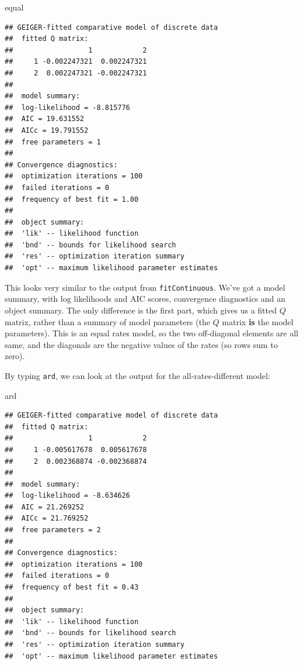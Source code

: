 \documentclass[]{book}
\newenvironment{Shaded}{\begin{snugshade}}{\end{snugshade}}
\newcommand{\NormalTok}[1]{{#1}}
\begin{document}
\begin{Shaded}
\begin{Highlighting}[]
\NormalTok{equal}
\end{Highlighting}
\end{Shaded}

\begin{verbatim}
## GEIGER-fitted comparative model of discrete data
##  fitted Q matrix:
##                  1            2
##     1 -0.002247321  0.002247321
##     2  0.002247321 -0.002247321
## 
##  model summary:
##  log-likelihood = -8.815776
##  AIC = 19.631552
##  AICc = 19.791552
##  free parameters = 1
## 
## Convergence diagnostics:
##  optimization iterations = 100
##  failed iterations = 0
##  frequency of best fit = 1.00
## 
##  object summary:
##  'lik' -- likelihood function
##  'bnd' -- bounds for likelihood search
##  'res' -- optimization iteration summary
##  'opt' -- maximum likelihood parameter estimates
\end{verbatim}

This looks very similar to the output from \texttt{fitContinuous}. We've
got a model summary, with log likelihoods and AIC scores, convergence
diagnostics and an object summary. The only difference is the first
part, which gives us a fitted \(Q\) matrix, rather than a summary of
model parameters (the \(Q\) matrix \textbf{is} the model parameters).
This is an equal rates model, so the two off-diagonal elements are all
same, and the diagonals are the negative values of the rates (so rows
sum to zero).

By typing \texttt{ard}, we can look at the output for the
all-rates-different model:

\begin{Shaded}
\begin{Highlighting}[]
\NormalTok{ard}
\end{Highlighting}
\end{Shaded}

\begin{verbatim}
## GEIGER-fitted comparative model of discrete data
##  fitted Q matrix:
##                  1            2
##     1 -0.005617678  0.005617678
##     2  0.002368874 -0.002368874
## 
##  model summary:
##  log-likelihood = -8.634626
##  AIC = 21.269252
##  AICc = 21.769252
##  free parameters = 2
## 
## Convergence diagnostics:
##  optimization iterations = 100
##  failed iterations = 0
##  frequency of best fit = 0.43
## 
##  object summary:
##  'lik' -- likelihood function
##  'bnd' -- bounds for likelihood search
##  'res' -- optimization iteration summary
##  'opt' -- maximum likelihood parameter estimates
\end{verbatim}
\end{document}
